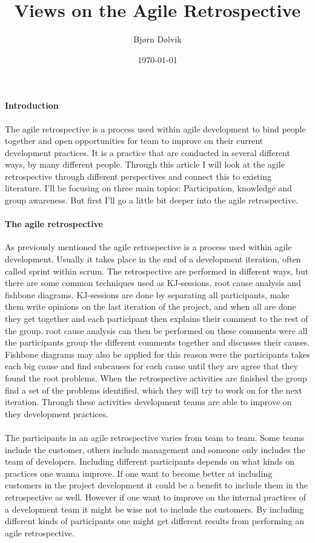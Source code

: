\documentclass{article}
\begin{document}
\title{Views on the Agile Retrospective}
\date{\today{}}
\author{Bjørn Dølvik}

\maketitle

\paragraph{Introduction}
The agile retrospective is a process used within agile development to bind people together and open opportunities for team to improve on their current development practices. It is a practice that are conducted in several different ways, by many different people. Through this article I will look at the agile retrospective through different perspectives and connect this to existing literature. I'll be focusing on three main topics: Participation, knowledge and group awareness. But first I'll go a little bit deeper into the agile retrospective.

\paragraph{The agile retrospective}
As previously mentioned the agile retrospective is a process used within agile development. Usually it takes place in the end of a development iteration, often called sprint within scrum. The retrospective are performed in different ways, but there are some common techniques used as KJ-sessions, root cause analysis and fishbone diagrams. KJ-sessions are done by separating all participants, make them write opinions on the last iteration of the project, and when all are done they get together and each participant then explains their comment to the rest of the group. root cause analysis can then be performed on these comments were all the participants group the different comments together and discusses their causes. Fishbone diagrams may also be applied for this reason were the participants takes each big cause and find subcauses for each cause until they are agree that they found the root problems. When the retrospective activities are finished the group find a set of the problems identified, which they will try to work on for the next iteration. Through these activities development teams are able to improve on they development practices. 

\paragraph{}
The participants in an agile retrospective varies from team to team. Some teams include the customer, others include management and someone only includes the team of developers. Including different participants depends on what kinds on practices one wanna improve. If one want to become better at including customers in the project development it could be a benefit to include them in the retrospective as well. However if one want to improve on the internal practices of a development team it might be wise not to include the customers. By including different kinds of participants one might get different results from performing an agile retrospective. 
\end{document}
